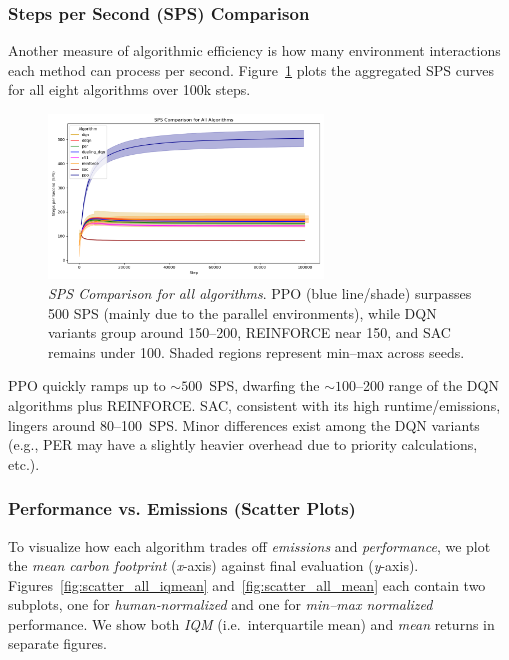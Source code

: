 \subsubsection{Steps per Second (SPS) Comparison}
Another measure of algorithmic efficiency is how many environment interactions each method 
can process per second. Figure~\ref{fig:sps_all} plots the aggregated SPS curves for all 
eight algorithms over 100k steps.

\begin{figure} 
	\centering
	\includegraphics[width=0.65\textwidth]{figures/comparison/sps_all.png}
	\caption{\emph{SPS Comparison for all algorithms}. PPO (blue line/shade) surpasses 
		500 SPS (mainly due to the parallel environments), while DQN variants group around 150--200, REINFORCE near 150, and SAC remains 
		under 100. Shaded regions represent min--max across seeds.}
	\label{fig:sps_all}
\end{figure}

PPO quickly ramps up to $\sim500$~SPS, dwarfing the $\sim100$--200 range of the DQN 
algorithms plus REINFORCE. 
SAC, consistent with its high runtime/emissions, lingers around 80--100~SPS. 
Minor differences exist among the DQN variants (e.g., PER may have a slightly heavier overhead 
due to priority calculations, etc.).

\subsubsection{Performance vs. Emissions (Scatter Plots)}
To visualize how each algorithm trades off \emph{emissions} and \emph{performance},
we plot the \textit{mean carbon footprint} (\textit{x}-axis) against final evaluation 
(\textit{y}-axis). Figures~\ref{fig:scatter_all_iqmean} and~\ref{fig:scatter_all_mean}
each contain two subplots, one for \textit{human‐normalized} and one for 
\textit{min--max normalized} performance. We show both \textit{IQM} (i.e.\ interquartile mean) 
and \textit{mean} returns in separate figures.

